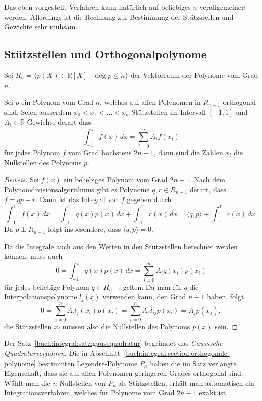Das eben vorgestellt Verfahren kann natürlich auf beliebiges $n$
verallgemeinert werden.
Allerdings ist die Rechnung zur Bestimmung der Stützstellen und
Gewichte sehr mühsam.

\subsection{Stützstellen und Orthogonalpolynome}
Sei $R_n=\{p(X)\in\mathbb{R}[X] \mid \deg p\le n\}$ der Vektorraum
der Polynome vom Grad $n$.

\begin{satz}
\label{buch:integral:satz:gaussquadratur}
Sei $p$ ein Polynom vom Grad $n$, welches auf allen Polynomen in $R_{n-1}$
orthogonal sind.
Seien ausserdem $x_0<x_1<\dots<x_n$ Stützstellen im Intervall $[-1,1]$ 
und $A_i\in\mathbb{R}$ Gewichte derart dass
\[
\int_{-1}^1 f(x)\,dx =
\sum_{i=0}^n A_if(x_i)
\]
für jedes Polynom $f$ vom Grad höchstens $2n-1$, dann sind die Zahlen
$x_i$ die Nullstellen des Polynoms $p$.
\end{satz}

\begin{proof}[Beweis]
Sei $f(x)$ ein beliebiges Polynom vom Grad $2n-1$.
Nach dem Polynomdivisionsalgorithmus gibt es
Polynome $q,r\in R_{n-1}$ derart, dass $f=qp+r$.
Dann ist das Integral von $f$ gegeben durch
\[
\int_{-1}^1 f(x)\,dx
=
\int_{-1}^1q(x) p(x)\,dx + \int_{-1}^1 r(x)\,dx
=
\langle q,p\rangle + \int_{-1}^1 r(x)\,dx.
\]
Da $p\perp R_{n-1}$ folgt insbesondere, dass $\langle q,p\rangle=0$.

Da die Integrale auch aus den Werten in den Stützstellen berechnet
werden können, muss auch
\[
0
=
\int_{-1}^1 q(x)p(x)\,dx
=
\sum_{i=0}^n A_iq(x_i)p(x_i)
\]
für jedes beliebige Polynom $q\in R_{n-1}$ gelten.
Da man für $q$ die Interpolationspolynome $l_j(x)$ verwenden
kann, den Grad $n-1$ haben, folgt
\[
0
=
\sum_{i=0}^n
A_il_j(x_i)p(x_i)
=
\sum_{i=0}^n A_i\delta_{ij}p(x_i)
=
A_jp(x_j),
\]
die Stützstellen $x_i$ müssen also die Nullstellen des Polynoms
$p(x)$ sein.
\end{proof}

Der Satz~\ref{buch:integral:satz:gaussquadratur} begründet das
{\em Gausssche Quadraturverfahren}.
Die in Abschnitt~\ref{buch:integral:section:orthogonale-polynome}
bestimmten Legendre-Polynome $P_n$ haben die im Satz
verlangte Eigenschaft,
dass sie auf allen Polynomen geringeren Grades orthogonal sind.
Wählt man die $n$ Nullstellen von $P_n$ als Stützstellen, erhält man 
automatisch ein Integrationsverfahren, welches für Polynome vom Grad
$2n-1$ exakt ist.

